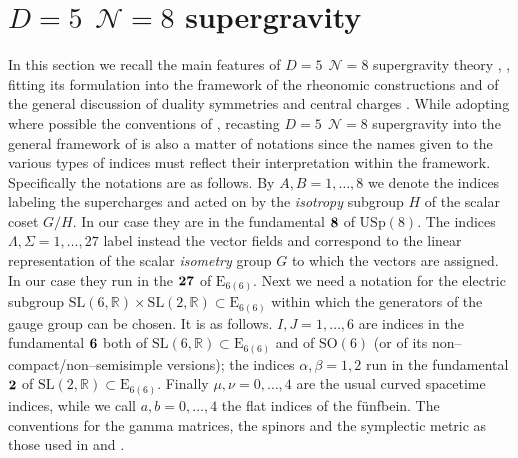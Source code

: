 \documentclass[a4paper,12pt]{article}
\begin{document}
\section{$D=5~~\mathcal{N}=8$ supergravity}
In this section we recall the main features of
$D=5~~\mathcal{N}=8$ supergravity theory \cite{gunwar},
\cite{PPV}, fitting its formulation into the framework of the
rheonomic constructions \cite{castdauriafre} and of the general
discussion of duality symmetries \cite{mylecture} and central
charges \cite{Andrianopoli:1997wf}. While adopting where possible
the conventions of \cite{gunwar}, recasting  $D=5~~\mathcal{N}=8$
supergravity into the general framework of
\cite{Andrianopoli:1997wf} is also a matter of notations since the
names given to the various types of indices must reflect their
interpretation within the framework. Specifically the notations
are as follows. By $A,B=1,\dots,8$ we denote the indices labeling
the supercharges and acted on by the {\it isotropy} subgroup $H$
of the scalar coset $G/H$. In our case they are in the fundamental
${\bf 8}$ of $\mathrm{USp(8)}$. The indices
$\Lambda,\Sigma=1,\dots,27$  label instead the vector fields and
correspond to the linear representation of the scalar {\it
isometry} group $G$ to which the vectors are assigned. In our case
they run in the ${\bf 27}$ of $\mathrm{E_{6(6)}}$. Next we need a
notation for the electric subgroup $\mathrm{SL}(6,\mathbb{R})
\times \mathrm{SL}(2,\mathbb{R}) \subset \mathrm{E_{6(6)}}$ within
which the generators of the gauge group can be chosen. It is as
follows. $I,J=1,\dots,6$ are indices in the fundamental  ${\bf 6}$
both of $\mathrm{SL}(6,\mathbb{R})\subset \mathrm{E_{6(6)}}$ and
of $\mathrm{SO(6)}$ (or of its non--compact/non--semisimple
versions); the indices $\alpha,\beta=1,2$ run in the fundamental
$\bf 2$ of $\mathrm{SL}(2,\mathbb{R})\subset \mathrm{E_{6(6)}}$.
Finally $\mu,\nu=0,\dots,4$ are the usual curved spacetime
indices, while  we call $a,b=0,\dots,4$ the flat indices of the
f\"unfbein. The conventions for the gamma matrices, the spinors
and the symplectic metric as those used in \cite{gunwar} and
\cite{cremmer}.
\end{document}
